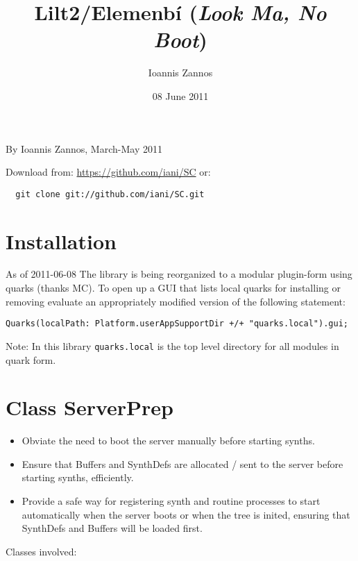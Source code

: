 \documentclass[11pt]{article}
\begin{document}
\title{Lilt2/Elemenb\'i (\emph{Look Ma, No Boot})}
\author{Ioannis Zannos}
\date{08 June 2011}
\maketitle

\setcounter{tocdepth}{3}
\tableofcontents
\vspace*{1cm}

By Ioannis Zannos, March-May 2011

Download from: \href{https://github.com/iani/SC}{https://github.com/iani/SC}
or:
\begin{verbatim}
  git clone git://github.com/iani/SC.git
\end{verbatim}


\section{Installation}
\label{sec-1}


As of 2011-06-08 The library is being reorganized to a modular plugin-form using quarks (thanks MC).  To open up a GUI that lists local quarks for installing or removing evaluate an appropriately modified version of the following statement: 

{\small
\begin{verbatim}
Quarks(localPath: Platform.userAppSupportDir +/+ "quarks.local").gui;
\end{verbatim}
}

Note: In this library \texttt{quarks.local} is the top level directory for all modules in quark form. 
\section{Class ServerPrep}
\label{sec-2}


\begin{itemize}
\item Obviate the need to boot the server manually before starting synths.
\item Ensure that Buffers and SynthDefs are allocated / sent to the server
  before starting synths, efficiently.
\item Provide a safe way for registering synth and routine processes to start automatically when the server boots
  or when the tree is inited, ensuring that SynthDefs and Buffers will be loaded first.
\end{itemize}

Classes involved: 
\end{document}
